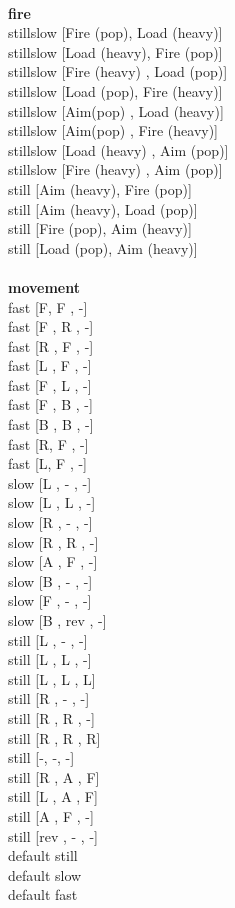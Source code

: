 \ \\ {\bf fire } \\
stillslow [Fire (pop), Load (heavy)] \\
stillslow [Load (heavy), Fire (pop)] \\
stillslow [Fire (heavy) ,  Load (pop)] \\
stillslow [Load (pop), Fire (heavy)] \\
stillslow [Aim(pop) ,  Load (heavy)] \\
stillslow [Aim(pop) ,  Fire (heavy)] \\
stillslow [Load (heavy) ,  Aim (pop)] \\
stillslow [Fire (heavy) ,  Aim (pop)] \\
still [Aim (heavy), Fire (pop)] \\
still [Aim (heavy), Load (pop)] \\
still [Fire (pop), Aim (heavy)] \\
still [Load (pop), Aim (heavy)] \\
\ \\ {\bf movement } \\
fast [F,  F ,  -] \\
fast [F ,  R ,  -] \\
fast [R ,  F ,  -] \\
fast [L ,  F ,  -] \\
fast [F ,  L ,  -] \\
fast [F ,  B ,  -] \\
fast [B ,  B ,  -] \\
fast [R,  F ,  -] \\
fast [L,  F ,  -] \\
slow [L ,  - ,  -] \\
slow [L ,  L ,  -] \\
slow [R ,  - ,  -] \\
slow [R ,  R ,  -] \\
slow [A ,  F ,  -] \\
slow [B ,  - ,  -] \\
slow [F ,  - ,  -] \\
slow [B ,  rev ,  -] \\
still [L ,  - ,  -] \\
still [L ,  L ,  -] \\
still [L ,  L ,  L] \\
still [R ,  - ,  -] \\
still [R ,  R ,  -] \\
still [R ,  R ,  R] \\
still [-, -, -] \\
still [R ,  A ,  F] \\
still [L ,  A ,  F] \\
still [A ,  F ,  -] \\
still [rev ,  - ,  -] \\
default still \\
default slow \\
default fast \\


